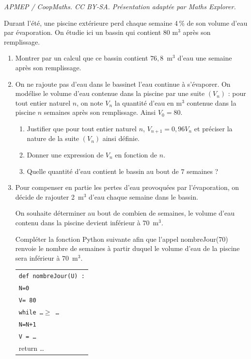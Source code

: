 \documentclass[10pt]{article}
\begin{document}
\noindent\textit{APMEP / CoopMaths. CC BY-SA. Présentation adaptée par Maths Explorer.}\par\medskip
\medskip

Durant l'été, une piscine extérieure perd chaque semaine 4\,\% de son volume d'eau par évaporation. On étudie ici un bassin qui contient 80 m$^3$ après son remplissage.

\medskip

\begin{enumerate}
\item Montrer par un calcul que ce bassin contient $76,8$~m$^3$ d'eau une semaine après son remplissage.
\item  On ne rajoute pas d'eau dans le bassinet l'eau continue à s'évaporer. On modélise le volume d'eau contenue dans la piscine par une suite $\left(V_n\right)$ : pour tout entier naturel $n$, on note $V_n$ la quantité d'eau en m$^3$ contenue dans la piscine $n$ semaines après son remplissage. Ainsi
$V_0 = 80$.
	\begin{enumerate}
		\item Justifier que pour tout entier naturel $n$,\: $V_{n+1} = 0,96 V_n$ et préciser la nature de la suite $\left(V_n\right)$ ainsi définie.
		\item Donner une expression de $V_n$ en fonction de $n$.
		\item Quelle quantité d'eau contient le bassin au bout de $7$ semaines ?
	\end{enumerate}
\item  Pour compenser en partie les pertes d'eau provoquées par l'évaporation, on décide de rajouter 2~m$^3$ d'eau chaque semaine dans le bassin. 

On souhaite déterminer au bout de combien de semaines, le volume d'eau contenu dans la piscine devient inférieur à $70$~m$^3$. 

Compléter la fonction Python suivante afin que l'appel nombreJour(70) renvoie le nombre de semaines à partir duquel le volume d'eau de la piscine sera inférieur à $70$~m$^3$.

\begin{center}
\begin{tabularx}{0.4\linewidth}{|X|}\hline
\texttt{def nombreJour(U) :}\\
\quad \texttt{N=0}\\
\quad \texttt{V= 80}\\
\quad \texttt{while \ldots  $\geqslant$ \ldots}\\
\qquad \texttt{N=N+1}\\
\qquad \texttt{V = \ldots}\\
\quad return \ldots\\ \hline
\end{tabularx}
\end{center}
\end{enumerate}

\bigskip
\end{document}
